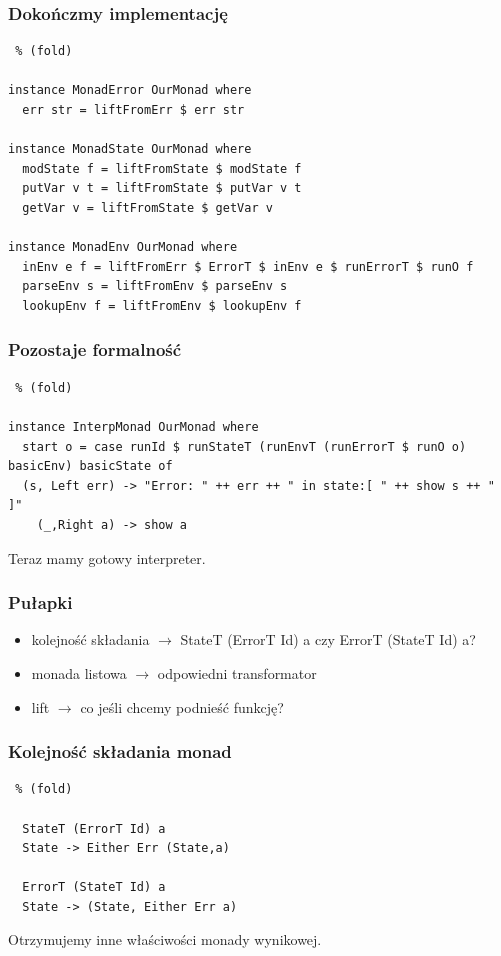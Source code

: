 \documentclass{beamer}
\begin{document}
\begin{frame}[fragile] %
  \frametitle{Dokończmy implementację}
  \begin{lstlisting} % (fold)

instance MonadError OurMonad where
  err str = liftFromErr $ err str

instance MonadState OurMonad where
  modState f = liftFromState $ modState f
  putVar v t = liftFromState $ putVar v t
  getVar v = liftFromState $ getVar v

instance MonadEnv OurMonad where
  inEnv e f = liftFromErr $ ErrorT $ inEnv e $ runErrorT $ runO f 
  parseEnv s = liftFromEnv $ parseEnv s
  lookupEnv f = liftFromEnv $ lookupEnv f

  \end{lstlisting}
\end{frame}

\begin{frame}[fragile] %
  \frametitle{Pozostaje formalność}
  \begin{lstlisting} % (fold)

instance InterpMonad OurMonad where
  start o = case runId $ runStateT (runEnvT (runErrorT $ runO o) basicEnv) basicState of
  (s, Left err) -> "Error: " ++ err ++ " in state:[ " ++ show s ++ " ]"
    (_,Right a) -> show a

  \end{lstlisting}
  Teraz mamy gotowy interpreter.
\end{frame}

\begin{frame} %
  \frametitle{Pułapki}
  \begin{itemize}
    \item kolejność składania $\rightarrow$ StateT (ErrorT Id) a czy ErrorT (StateT Id) a?
    \item monada listowa $\rightarrow$ odpowiedni transformator
    \item lift $\rightarrow$ co jeśli chcemy podnieść funkcję?
  \end{itemize}
\end{frame}

\begin{frame}[fragile] %
  \frametitle{Kolejność składania monad}
  \begin{lstlisting} % (fold)
  
  StateT (ErrorT Id) a
  State -> Either Err (State,a)

  ErrorT (StateT Id) a
  State -> (State, Either Err a)

  \end{lstlisting}
  Otrzymujemy inne właściwości monady wynikowej. 
\end{frame}
\end{document}
